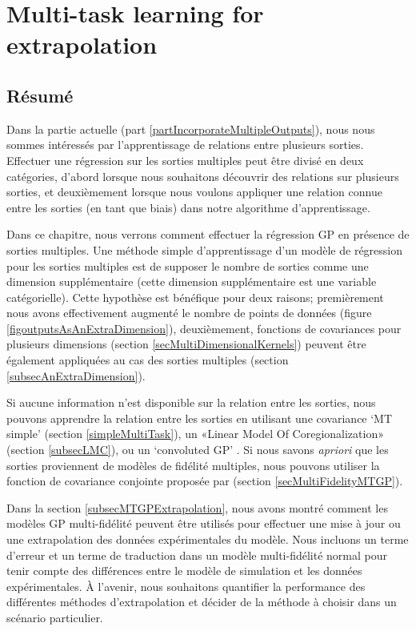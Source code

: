 \chapter{Multi-task learning for extrapolation}
\label{chapMultiTaskExtrapolation}

\begin{mdframed}[hidealllines=true,backgroundcolor=lightgray!20]
\section*{Résumé}
Dans la partie actuelle (part \ref{partIncorporateMultipleOutputs}), nous nous sommes intéressés par l'apprentissage de relations entre plusieurs sorties. Effectuer une régression sur les sorties multiples peut être divisé en deux catégories, d'abord lorsque nous souhaitons découvrir des relations sur plusieurs sorties, et deuxièmement lorsque nous voulons appliquer une relation connue entre les sorties (en tant que biais) dans notre algorithme d'apprentissage.

Dans ce chapitre, nous verrons comment effectuer la régression GP en présence de sorties multiples. Une méthode simple d'apprentissage d'un modèle de régression pour les sorties multiples est de supposer le nombre de sorties comme une dimension supplémentaire (cette dimension supplémentaire est une variable catégorielle). Cette hypothèse est bénéfique pour deux raisons; premièrement nous avons effectivement augmenté le nombre de points de données (figure \ref{figoutputsAsAnExtraDimension}), deuxièmement, fonctions de covariances pour plusieurs dimensions (section \ref{secMultiDimensionalKernels}) peuvent être également appliquées au cas des sorties multiples (section \ref{subsecAnExtraDimension}).

Si aucune information n'est disponible sur la relation entre les sorties, nous pouvons apprendre la relation entre les sorties en utilisant une covariance `MT simple’ (section \ref{simpleMultiTask}), un «Linear Model Of Coregionalization» (section \ref{subsecLMC}), ou un `convoluted GP’ \cite{alvarez2011kernels}. Si nous savons \textit{apriori} que les sorties proviennent de modèles de fidélité multiples, nous pouvons utiliser la fonction de covariance conjointe proposée par \cite{kennedy2000predicting} (section \ref{secMultiFidelityMTGP}).

Dans la section \ref{subsecMTGPExtrapolation}, nous avons montré comment les modèles GP multi-fidélité peuvent être utilisés pour effectuer une mise à jour ou une extrapolation des données expérimentales du modèle. Nous incluons un terme d'erreur et un terme de traduction dans un modèle multi-fidélité normal pour tenir compte des différences entre le modèle de simulation et les données expérimentales. À l'avenir, nous souhaitons quantifier la performance des différentes méthodes d'extrapolation et décider de la méthode à choisir dans un scénario particulier.
\end{mdframed}


